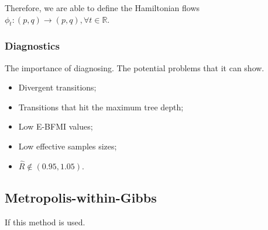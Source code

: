 Therefore, we are able to define the Hamiltonian flows $\phi_t : (p,q) \to
(p,q), \forall t \in \mathbb{R}$.

\subsubsection{Diagnostics}

The importance of diagnosing. The potential problems that it can show. 

\begin{itemize}
  \item Divergent transitions; 
  \item Transitions that hit the maximum tree depth; 
  \item Low E-BFMI values; 
  \item Low effective samples sizes; 
  \item $\hat{R} \not \in (0.95, 1.05)$.   
\end{itemize}

\subsection{Metropolis-within-Gibbs}

If this method is used. 